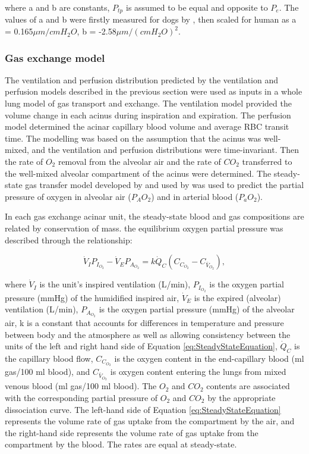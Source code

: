 \noindent where a and b are constants, $P_{tp}$ is assumed to be equal and opposite to $P_e$. The values of a and b were firstly measured for dogs by \cite{glazier1969measurements}, then scaled for human as a = 0.165$\mu m/cmH_2O$, b = -2.58$\mu m/{(cmH_2O)}^2$.

\subsubsection{Gas exchange model}
The ventilation and perfusion distribution predicted by the ventilation and perfusion models described in the previous section were used as inputs in a whole lung model of gas transport and exchange. The ventilation model provided the volume change in each acinus during inspiration and expiration. The perfusion model determined the acinar capillary blood volume and average RBC transit time. The modelling was based on the assumption that the acinus was well-mixed, and the ventilation and perfusion distributions were time-invariant. Then the rate of $O_2$ removal from the alveolar air and the rate of $CO_2$ transferred to the well-mixed alveolar compartment of the acinus were determined. The steady-state gas transfer model developed by \cite{kapitan1986computer} and used by \cite{clark2014lack} was used to predict the partial pressure of oxygen in alveolar air ($P_AO_2$) and in arterial blood ($P_aO_2$).

In each gas exchange acinar unit, the steady-state blood and gas compositions are related by conservation of mass. the equilibrium oxygen partial pressure was described through the relationship:

\begin{equation} 
 \label{eq:SteadyStateEquation}
 \dot{V}_I P_{I_{O_2}} - \dot{V}_E P_{A_{O_2}} = k\dot{Q}_C(C_{C_{O_2}} - C_{\bar{V}_{O_2}}),
\end{equation}

\noindent where $\dot{V}_I$ is the unit's inspired ventilation (L/min), $P_{I_{O_2}}$ is the oxygen partial pressure (mmHg) of the humidified inspired air,  $\dot{V}_E$ is the expired (alveolar) ventilation (L/min), $P_{A_{O_2}}$ is the oxygen partial pressure (mmHg) of the alveolar air, k is a constant that accounts for differences in temperature and pressure between body and the atmosphere as well as allowing consistency between the units of the left and right hand side of Equation \ref{eq:SteadyStateEquation}, $\dot{Q}_C$ is the capillary blood flow, $C_{C_{O_2}}$ is the oxygen content in the end-capillary blood (ml gas/100 ml blood), and $C_{\bar{V}_{O_2}}$ is oxygen content entering the lungs from mixed venous blood (ml gas/100 ml blood). The $O_2$ and $CO_2$ contents are associated with the corresponding partial pressure of $O_2$ and $CO_2$ by the appropriate dissociation curve. The left-hand side of Equation \ref{eq:SteadyStateEquation} represents the volume rate of gas uptake from the compartment by the air, and the right-hand side represents the volume rate of gas uptake from the compartment by the blood. The rates are equal at steady-state.


